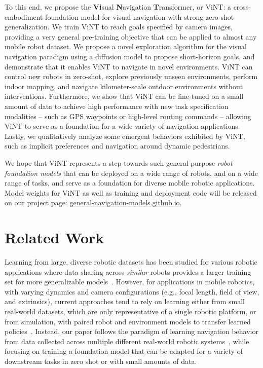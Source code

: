 \documentclass{article}
\newcommand{\ModelName}{ViNT\xspace}
\newcommand{\basement}{foundation\xspace}
\newcommand{\projectpage}[0]{\href{https://general-navigation-models.github.io}{general-navigation-models.github.io}}
\begin{document}
To this end, we propose the \textbf{Vi}sual \textbf{N}avigation \textbf{T}ransformer, or \ModelName: a cross-embodiment \basement model for visual navigation with strong zero-shot generalization.
We train \ModelName to reach goals specified by camera images, providing a very general pre-training objective that can be applied to almost any mobile robot dataset.
We propose a novel exploration algorithm for the visual navigation paradigm using a diffusion model to propose short-horizon goals, and demonstrate that it enables \ModelName to navigate in novel environments.
\ModelName can control new robots in zero-shot, explore previously unseen environments, perform indoor mapping, and navigate kilometer-scale outdoor environments without interventions.
Furthermore, we show that \ModelName can be fine-tuned on a small amount of data to achieve high performance with new task specification modalities -- such as GPS waypoints or high-level routing commands -- allowing \ModelName to serve as a \basement for a wide variety of navigation applications. Lastly, we qualitatively analyze some emergent behaviors exhibited by \ModelName, such as implicit preferences and navigation around dynamic pedestrians.

We hope that \ModelName represents a step towards such general-purpose \emph{robot foundation models} that can be deployed on a wide range of robots, and on a wide range of tasks, and serve as a \basement for diverse mobile robotic applications.
Model weights for \ModelName as well as training and deployment code will be released on our project page: \projectpage.

\vspace*{-0.5em}
\section{Related Work}
\label{sec:related_work}
\vspace*{-0.5em}


Learning from large, diverse robotic datasets has been studied for various robotic applications where data sharing across \emph{similar} robots provides a larger training set for more generalizable models~\cite{devin2017multi, dasari2020robonet, Yu2020bdd100k}. However, for applications in mobile robotics, with varying dynamics and camera configurations (e.g., focal length, field of view, and extrinsics),
current approaches tend to rely on learning either from small real-world datasets, which are only representative of a single robotic platform, or from simulation, with paired robot and environment models to transfer learned policies~\cite{anderson2020simtoreal, truong2023i2o, kadian2020sim2real}. Instead, our paper follows the paradigm of learning navigation behavior from data collected across multiple different real-world robotic systems~\cite{loquercio2018dronet, hirose2022exaug, shah2022gnm}, while focusing on training a \basement model that can be adapted for a variety of downstream tasks in zero shot or with small amounts of data.
\end{document}
